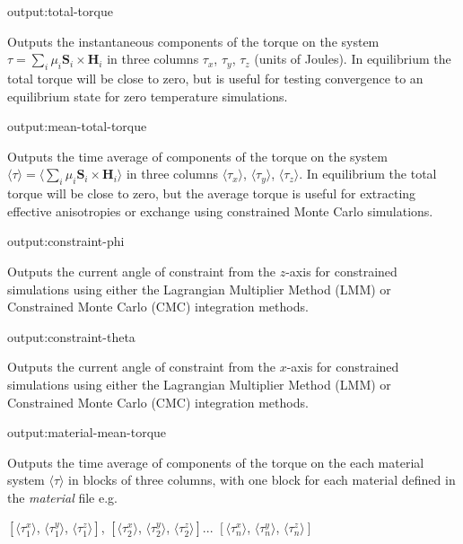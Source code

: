 {\zicf output:total-torque} Outputs the instantaneous components of the torque on the system $\tau = \sum_i\mu_i \mathbf{S}_i \times \mathbf{H}_i$ in three columns $\tau_x$, $\tau_y$, $\tau_z$ (units of Joules). In equilibrium the total torque will be close to zero, but is useful for testing convergence to an equilibrium state for zero temperature simulations.

{\zicf output:mean-total-torque} Outputs the time average of components of the torque on the system $\langle\tau\rangle = \langle\sum_i \mu_i \mathbf{S}_i \times \mathbf{H}_i \rangle$ in three columns $\langle\tau_x
\rangle$, $\langle\tau_y \rangle$, $\langle\tau_z \rangle$. In equilibrium the total torque will be close to zero, but the average torque is useful for extracting effective anisotropies or exchange using constrained Monte Carlo simulations.

{\zicf output:constraint-phi} Outputs the current angle of constraint from the $z$-axis for constrained simulations using either the Lagrangian Multiplier Method (LMM) or Constrained Monte Carlo (CMC) integration methods.

{\zicf output:constraint-theta} Outputs the current angle of constraint from the $x$-axis for constrained simulations using either the Lagrangian Multiplier Method (LMM) or Constrained Monte Carlo (CMC) integration methods.



{\zicf output:material-mean-torque} Outputs the time average of components of the torque on the each material system $\langle\tau\rangle$ in blocks of three columns, with one block for each material defined in the \textit{material} file e.g.

\begin{center}
$\left[ \langle\tau_1^x \rangle \right.$, $\langle\tau_1^y \rangle$, $\left. \langle\tau_1^z \rangle \right]$,
$\left[ \langle\tau_2^x \rangle \right.$, $\langle\tau_2^y \rangle$, $\left. \langle\tau_2^z \rangle \right]$...
$\left[ \langle\tau_n^x \rangle \right.$, $\langle\tau_n^y \rangle$, $\left. \langle\tau_n^z \rangle \right]$
\end{center}

